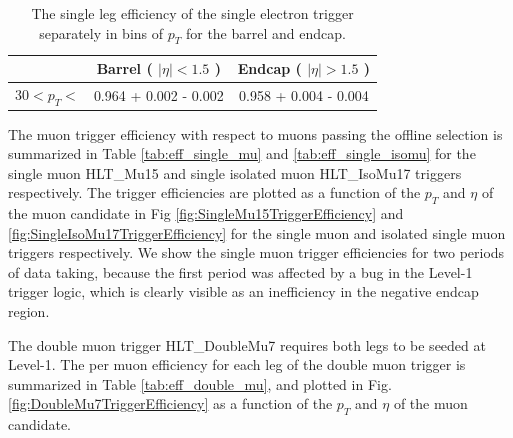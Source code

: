 \begin{table}[!ht]
\begin{center}
\begin{tabular}{c|c|c} \hline
              & Barrel ( $|\eta|<1.5$ )  & Endcap ( $|\eta|>1.5$ )  \\  \hline
\hline
30$<p_{T}<$   & 0.964 + 0.002 - 0.002 & 0.958 + 0.004 - 0.004 \\
\hline
\end{tabular}
\caption{The single leg efficiency of the single electron trigger 
separately in bins of $p_{T}$ for the barrel and endcap.
\label{tab:Ele27Efficiency}}
\end{center}
\end{table}

%
%
%

The muon trigger efficiency with respect to muons passing the offline
selection is summarized in Table \ref{tab:eff_single_mu} and 
\ref{tab:eff_single_isomu} for the single muon {HLT\_Mu15} and 
single isolated muon {HLT\_IsoMu17} triggers respectively. 
The trigger efficiencies are plotted as a function of the $p_{T}$ and $\eta$ of the
muon candidate in Fig \ref{fig:SingleMu15TriggerEfficiency} and 
\ref{fig:SingleIsoMu17TriggerEfficiency} for the single muon and 
isolated single muon triggers respectively. 
We show the single muon trigger efficiencies for two periods of data taking,
because the first period was affected by a bug in the Level-1 trigger logic,
which is clearly visible as an inefficiency in the negative endcap region.

The double muon trigger {HLT\_DoubleMu7 } requires both legs to be seeded at Level-1. 
The per muon efficiency for each leg of the double muon trigger is 
summarized in Table \ref{tab:eff_double_mu}, and plotted in 
Fig. \ref{fig:DoubleMu7TriggerEfficiency} as a function of the $p_{T}$
and $\eta$ of the muon candidate.

